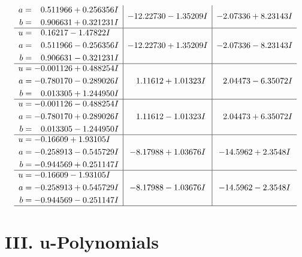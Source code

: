 \documentclass[1p]{elsarticle_modified}
\theoremstyle{definition}
\begin{document}
$$\begin{array}{c|c|c}
\begin{aligned}
a &= \phantom{-}0.511966 + 0.256356 I \\
b &= \phantom{-}0.906631 + 0.321231 I\end{aligned}
 & -12.22730 - 1.35209 I & -2.07336 + 8.23143 I \\ \hline\begin{aligned}
u &= \phantom{-}0.16217 - 1.47822 I \\
a &= \phantom{-}0.511966 - 0.256356 I \\
b &= \phantom{-}0.906631 - 0.321231 I\end{aligned}
 & -12.22730 + 1.35209 I & -2.07336 - 8.23143 I \\ \hline\begin{aligned}
u &= -0.001126 + 0.488254 I \\
a &= -0.780170 - 0.289026 I \\
b &= \phantom{-}0.013305 + 1.244950 I\end{aligned}
 & \phantom{-}1.11612 + 1.01323 I & \phantom{-}2.04473 - 6.35072 I \\ \hline\begin{aligned}
u &= -0.001126 - 0.488254 I \\
a &= -0.780170 + 0.289026 I \\
b &= \phantom{-}0.013305 - 1.244950 I\end{aligned}
 & \phantom{-}1.11612 - 1.01323 I & \phantom{-}2.04473 + 6.35072 I \\ \hline\begin{aligned}
u &= -0.16609 + 1.93105 I \\
a &= -0.258913 - 0.545729 I \\
b &= -0.944569 + 0.251147 I\end{aligned}
 & -8.17988 + 1.03676 I & -14.5962 + 2.3548 I \\ \hline\begin{aligned}
u &= -0.16609 - 1.93105 I \\
a &= -0.258913 + 0.545729 I \\
b &= -0.944569 - 0.251147 I\end{aligned}
 & -8.17988 - 1.03676 I & -14.5962 - 2.3548 I\\
 \hline 
 \end{array}$$\newpage
\newpage\renewcommand{\arraystretch}{1}
\centering \section*{ III. u-Polynomials}
\end{document}
